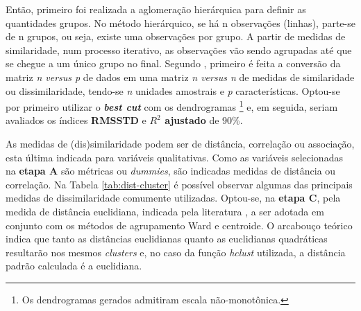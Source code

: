Então, primeiro foi realizada a aglomeração hierárquica para definir as quantidades grupos.
No método hierárquico, se há n observações (linhas), parte-se de n grupos, ou seja, existe uma observações por grupo. A partir de medidas de similaridade, num processo iterativo, as observações vão sendo agrupadas até que se chegue a um único grupo no final. Segundo \cite{MAXWELL1977}, primeiro é feita a conversão da matriz \textit{n versus p} de dados em uma matriz \textit{n versus n} de medidas de similaridade ou dissimilaridade, tendo-se \textit{n} unidades amostrais e \textit{p} características.
Optou-se por primeiro utilizar o \textbf{\textit{best cut}} com os dendrogramas
\footnote{Os dendrogramas gerados admitiram escala não-monotônica.} 
e, em seguida, seriam avaliados os índices \textbf{RMSSTD} e \textbf{$R^2$ ajustado} de 90\%.

As medidas de (dis)similaridade podem ser de distância, correlação ou associação, esta última indicada para variáveis qualitativas. Como as variáveis selecionadas na \textbf{etapa A} são métricas ou \textit{dummies}, são indicadas medidas de distância ou correlação. 
Na Tabela \ref{tab:dist-cluster} é possível observar algumas das principais medidas de dissimilaridade comumente utilizadas.
Optou-se, na \textbf{etapa C}, pela medida de distância euclidiana, indicada pela literatura , 
a ser adotada em conjunto com os métodos de agrupamento Ward \cite{WARD1963} e centroide. O arcabouço teórico indica que tanto as distâncias euclidianas quanto as euclidianas quadráticas resultarão nos mesmos \textit{clusters} e, no caso da função \textit{hclust} utilizada, a distância padrão calculada é a euclidiana.



